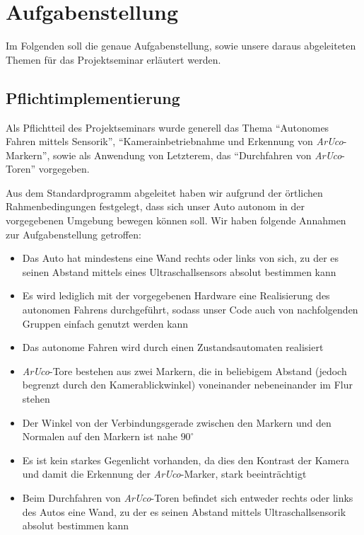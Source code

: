 \section{Aufgabenstellung}
\label{sec:aufgabenstellung}

Im Folgenden soll die genaue Aufgabenstellung, sowie unsere daraus abgeleiteten Themen für das Projektseminar erläutert werden.

\subsection{Pflichtimplementierung}
Als Pflichtteil des Projektseminars wurde generell das Thema "`Autonomes Fahren mittels Sensorik"', "`Kamerainbetriebnahme und Erkennung von \textit{ArUco}-Markern"', sowie als Anwendung von Letzterem, das "`Durchfahren von \textit{ArUco}-Toren"' vorgegeben.  

Aus dem Standardprogramm abgeleitet haben wir aufgrund der örtlichen Rahmenbedingungen festgelegt, dass sich unser Auto autonom in der vorgegebenen Umgebung bewegen können soll. 
Wir haben folgende Annahmen zur Aufgabenstellung getroffen:
\begin{itemize}
	\item Das Auto hat mindestens eine Wand rechts oder links von sich, zu der es seinen Abstand mittels eines Ultraschallsensors absolut bestimmen kann
	\item Es wird lediglich mit der vorgegebenen Hardware eine Realisierung des autonomen Fahrens durchgeführt, sodass unser Code auch von nachfolgenden Gruppen einfach genutzt werden kann
	\item Das autonome Fahren wird durch einen Zustandsautomaten realisiert
	\item \textit{ArUco}-Tore bestehen aus zwei Markern, die in beliebigem Abstand (jedoch begrenzt durch den Kamerablickwinkel) voneinander nebeneinander im Flur stehen
	\item Der Winkel von der Verbindungsgerade zwischen den Markern und den Normalen auf den Markern ist nahe $90^\circ$
	\item Es ist kein starkes Gegenlicht vorhanden, da dies den Kontrast der Kamera und damit die Erkennung der \textit{ArUco}-Marker, stark beeinträchtigt
	\item Beim Durchfahren von \textit{ArUco}-Toren befindet sich entweder rechts oder links des Autos eine Wand, zu der es seinen Abstand mittels Ultraschallsensorik absolut bestimmen kann
\end{itemize}


